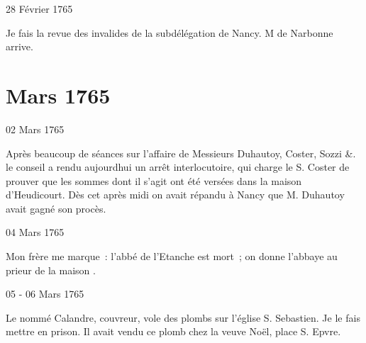                      \begin{diary}{28 Février 1765}{}
                        
                         Je fais la revue des invalides de
                           la
                           subdélégation de Nancy.
                           M de Narbonne arrive. \bigskip
        
        
                     \end{diary}
                  \chapter*{Mars 1765}
                     
                     
                     
                     \begin{diary}{02 Mars 1765}{}
                        
                         Après beaucoup de séances sur
                           l'affaire
                           de Messieurs
                           Duhautoy, Coster, Sozzi &. le conseil
                           a rendu aujourdhui un arrêt
                           interlocutoire,
                           qui charge le S. Coster de
                           prouver que les sommes
                           dont il s'agit ont été versées dans la maison
                              d'Heudicourt. Dès cet après midi on avait
                           répandu à Nancy que M. Duhautoy avait
                           gagné son procès. \bigskip
        
        
                     \end{diary}

                     \begin{diary}{04 Mars 1765}{}
                        
                        
                           Mon frère me marque : \og l'abbé de l'Etanche
                              est mort ; on donne l'abbaye au prieur de la maison \fg{}. \bigskip
        
        
                     \end{diary}

                     \begin{diary}{05 - 06 Mars 1765}{}
                        
                        
                           Le nommé Calandre, couvreur, vole
                           des
                           plombs sur l’église S.
                              Sebastien. Je le fais
                           mettre en prison. Il avait vendu ce plomb
                           chez
                           la veuve Noël, place
                              S. Epvre. \bigskip
        
        
                     \end{diary}

